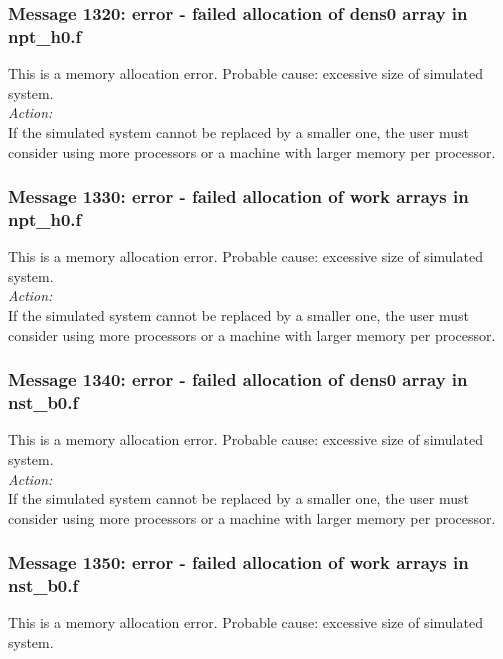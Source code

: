 \subsubsection*{Message 1320: error - failed allocation of dens0 array
in npt\_h0.f}

This is a memory allocation error. Probable cause: excessive size of
simulated system. \\

\noindent
{\em Action:}\\
If the simulated system cannot be replaced by a smaller one, the user
must consider using more processors or a machine with larger memory
per processor.

\subsubsection*{Message 1330: error - failed allocation of work arrays
in npt\_h0.f}

This is a memory allocation error. Probable cause: excessive size of
simulated system. \\

\noindent
{\em Action:}\\
If the simulated system cannot be replaced by a smaller one, the user
must consider using more processors or a machine with larger memory
per processor.

\subsubsection*{Message 1340: error - failed allocation of dens0 array
in nst\_b0.f}

This is a memory allocation error. Probable cause: excessive size of
simulated system. \\

\noindent
{\em Action:}\\
If the simulated system cannot be replaced by a smaller one, the user
must consider using more processors or a machine with larger memory
per processor.

\subsubsection*{Message 1350: error - failed allocation of work arrays
in nst\_b0.f}

This is a memory allocation error. Probable cause: excessive size of
simulated system. \\

